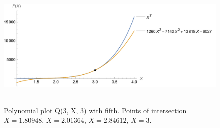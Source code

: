 ﻿\begin{figure}[H]
    \centering
    \includegraphics[width=1\textwidth]{sections/images/06_plots_polynomial_q3_n3_with_seventh}
    ~\caption{Polynomial plot Q(3, X, 3) with fifth.
    Points of intersection $X=1.80948$, $X=2.01364$, $X=2.84612$, $X=3$.}\label{fig:figure12}
\end{figure}
